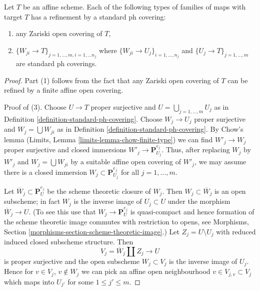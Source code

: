 \begin{lemma}
\label{lemma-refine-by-standard-ph}
Let $T$ be an affine scheme. Each of the following types of families
of maps with target $T$ has a refinement by a standard ph covering:
\begin{enumerate}
\item any Zariski open covering of $T$,
\item $\{W_{ji} \to T\}_{j = 1, \ldots, m, i = 1, \ldots n_j}$
where $\{W_{ji} \to U_j\}_{i = 1, \ldots, n_j}$
and $\{U_j \to T\}_{j = 1, \ldots, m}$ are standard ph coverings.
\end{enumerate}
\end{lemma}

\begin{proof}
Part (1) follows from the fact that any Zariski open covering of $T$
can be refined by a finite affine open covering.

\medskip\noindent
Proof of (3). Choose $U \to T$ proper surjective and
$U = \bigcup_{j = 1, \ldots, m} U_j$ as in
Definition \ref{definition-standard-ph-covering}.
Choose $W_j \to U_j$ proper surjective and $W_j = \bigcup W_{ji}$
as in Definition \ref{definition-standard-ph-covering}.
By Chow's lemma (Limits, Lemma \ref{limits-lemma-chow-finite-type})
we can find $W'_j \to W_j$ proper surjective
and closed immersions $W'_j \to \mathbf{P}^{e_j}_{U_j}$.
Thus, after replacing $W_j$ by $W'_j$ and $W_j = \bigcup W_{ji}$
by a suitable affine open covering of $W'_j$, we may assume
there is a closed immersion $W_j \subset \mathbf{P}^{e_j}_{U_j}$
for all $j = 1, \ldots, m$.

\medskip\noindent
Let $\overline{W}_j \subset \mathbf{P}^{e_j}_U$ be the
scheme theoretic closure of $W_j$. Then $W_j \subset \overline{W}_j$
is an open subscheme; in fact $W_j$ is the inverse image of
$U_j \subset U$ under the morphism $\overline{W}_j \to U$.
(To see this use that $W_j \to \mathbf{P}^{e_j}_U$ is quasi-compact
and hence formation of the scheme theoretic image commutes
with restriction to opens, see
Morphisms, Section \ref{morphisms-section-scheme-theoretic-image}.)
Let $Z_j = U \setminus U_j$
with reduced induced closed subscheme structure.
Then
$$
V_j = \overline{W}_j \amalg Z_j \to U
$$
is proper surjective and the open subscheme $W_j \subset V_j$
is the inverse image of $U_j$. Hence for $v \in V_j$, $v \not \in W_j$
we can pick an affine open neighbourhood $v \in V_{j, v} \subset V_j$
which maps into $U_{j'}$ for some $1 \leq j' \leq m$.


\end{proof}

